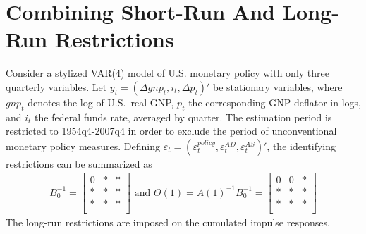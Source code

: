 \section[Combining Short-Run And Long-Run Restrictions]{Combining Short-Run And Long-Run Restrictions\label{ex:CombiningShortRunAndLongRunRestrictions}}
Consider a stylized VAR(4) model of U.S. monetary policy with only three quarterly variables.
Let \(y_t = (\Delta gnp_t, i_t, \Delta p_t)'\) be stationary variables,
  where \(gnp_t\) denotes the log of U.S.\ real GNP,
  \(p_t\) the corresponding GNP deflator in logs,
  and \(i_t\) the federal funds rate, averaged by quarter.
The estimation period is restricted to 1954q4-2007q4 in order to exclude the period of unconventional monetary policy measures.
Defining \(\varepsilon_t = (\varepsilon_t^{policy}, \varepsilon_t^{AD}, \varepsilon_t^{AS})'\),
  the identifying restrictions can be summarized as
\begin{align*}
B_0^{-1}  = \begin{bmatrix}
    0 & * & *\\
    * & * & *\\
    * & * & *\\
    \end{bmatrix} \text{~and~}
    \Theta(1) = A(1)^{-1} B_0^{-1} =  \begin{bmatrix}
    0 & 0 & *\\
    * & * & *\\
    * & * & *\\
    \end{bmatrix}
\end{align*}
The long-run restrictions are imposed on the cumulated impulse responses.

